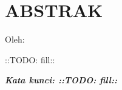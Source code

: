 \clearpage
\chapter*{ABSTRAK}

\begin{center}
  \center
  \begin{singlespace}
    \large\bfseries\MakeUppercase{\thetitle}
    
    \normalfont\normalsize
    Oleh:
    
    \bfseries \theauthor
  \end{singlespace}
\end{center}

\begin{singlespace}
  \small
  ::TODO: fill::

  \textbf{\textit{Kata kunci: ::TODO: fill:: }}
  
\end{singlespace}
\clearpage